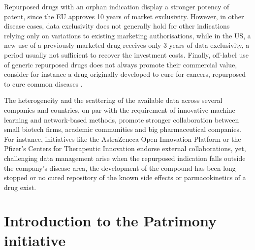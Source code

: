 Repurposed drugs with an orphan indication display a stronger potency of patent, since the EU approves 10 years of market exclusivity. However, in other disease cases, data exclusivity does not generally hold for other indications relying only on variations to existing marketing authorisations, while in the US, a new use of a previously marketed drug receives only 3 years of data exclusivity, a period usually not sufficient to recover the investment costs. Finally, off-label use of generic repurposed drugs does not always promote their commercial value, consider for instance a drug originally developed to cure for cancers, repurposed to cure common diseases \autocite{murteira_etal14}. 

The heterogeneity and the scattering of the available data across several companies and countries, on par with the requirement of innovative machine learning and network-based methods, promote stronger collaboration between small biotech firms, academic communities and big pharmaceutical companies. For instance, initiatives like the AstraZeneca Open Innovation Platform or the Pfizer's Centers for Therapeutic Innovation \autocite {ashburn_thor04} endorse external collaborations, yet, challenging data management arise when the repurposed indication falls outside the company's disease area, the development of the compound has been long stopped or no cured repository of the known side effects or parmacokinetics of a drug exist.

%

\section{Introduction to the Patrimony initiative}
\label{sec:patrimony-overview}

